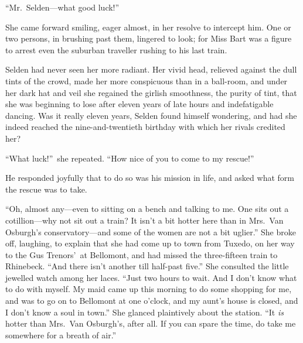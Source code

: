 \documentclass[12pt,a4paper]{book}
\begin{document}
``Mr.\ Selden---what good luck!''





She came forward smiling, eager almost, in her resolve to
intercept him. One or two persons, in brushing past them,
lingered to look; for Miss Bart was a figure to arrest even the
suburban traveller rushing to his last train.





Selden had never seen her more radiant. Her vivid head, relieved
against the dull tints of the crowd, made her more conspicuous
than in a ball-room, and under her dark hat and veil she regained
the girlish smoothness, the purity of tint, that she was
beginning to lose after eleven years of late hours and
indefatigable dancing. Was it really eleven years, Selden found
himself wondering, and had she indeed reached the
nine-and-twentieth birthday with which her rivals credited her?





``What luck!''\ she repeated. ``How nice of you to come to my
rescue!''





He responded joyfully that to do so was his mission in life, and
asked what form the rescue was to take.





``Oh, almost any---even to sitting on a bench and talking to me. 
One sits out a cotillion---why not sit out a train? It isn't a bit
hotter here than in Mrs.\ Van Osburgh's conservatory---and some of
the women are not a bit uglier.''  She broke off, laughing, to
explain that she had come up to town from Tuxedo, on her way to
the Gus Trenors'\ at Bellomont, and had missed the three-fifteen
train to Rhinebeck.  ``And there isn't another till half-past
five.'' She consulted the little jewelled watch among her laces. 
``Just two hours to wait. And I don't know what to do with myself. 
My maid came up this morning to do some shopping for me, and was
to go on to Bellomont at one o'clock, and my aunt's house is
closed, and I don't know a soul in town.'' She glanced plaintively
about the station. ``It \textit{is} hotter than Mrs.\ Van Osburgh's, after
all. If you can spare the time, do take me somewhere for a breath
of air.''
\end{document}
